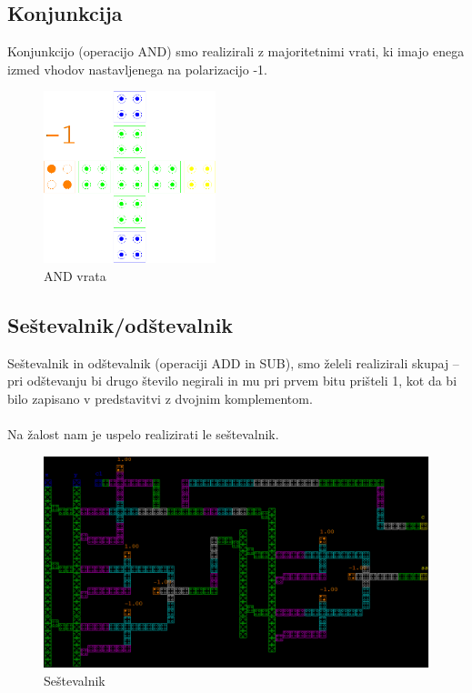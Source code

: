 \documentclass[seminar, slovene]{FRIreport}
\begin{document}
\subsection{Konjunkcija}
Konjunkcijo (operacijo AND) smo realizirali z majoritetnimi vrati, ki imajo enega izmed vhodov nastavljenega na polarizacijo -1.
\begin{figure}[h!]
\begin{center}
\includegraphics[width=5cm]{qca/img/AND}
\caption{AND vrata}
\label{AND}
\end{center}
\end{figure}

\subsection{Seštevalnik/odštevalnik}
Seštevalnik in odštevalnik (operaciji ADD in SUB), smo želeli realizirali skupaj -- pri odštevanju bi drugo število negirali in mu pri prvem bitu prišteli 1, kot da bi bilo zapisano v predstavitvi z dvojnim komplementom.\\
\ \\
Na žalost nam je uspelo realizirati le seštevalnik.

\begin{figure}[h!]
\begin{center}
\includegraphics[width=15cm]{qca/img/adder}
\caption{Seštevalnik}
\label{sestevalnikqca}
\end{center}
\end{figure}
\end{document}
